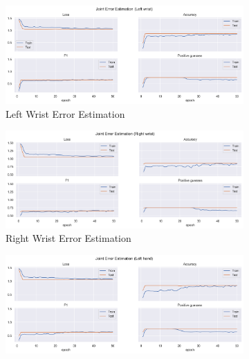   
  \begin{figure}[!ht]
    \centering
    \begin{subfigure}[b]{0.47\linewidth}
        \centering
        \includegraphics[width=\textwidth]{figures/Results/v2/jt/Left wrist_ErrorEstimation.png}
        \caption{Left Wrist Error Estimation}
        \label{fig:v2_lewr_jt_ee}
    \end{subfigure}
    \hfill
    \begin{subfigure}[b]{0.47\linewidth}
        \centering
        \includegraphics[width=\textwidth]{figures/Results/v2/jt/Right wrist_ErrorEstimation.png}
        \caption{Right Wrist Error Estimation}
        \label{fig:v2_riwr_jt_ee}
    \end{subfigure}
    \hfill
    \begin{subfigure}[b]{0.47\linewidth}
        \centering
        \includegraphics[width=\textwidth]{figures/Results/v2/jt/Left hand_ErrorEstimation.png}

\end{subfigure}
\end{figure}
